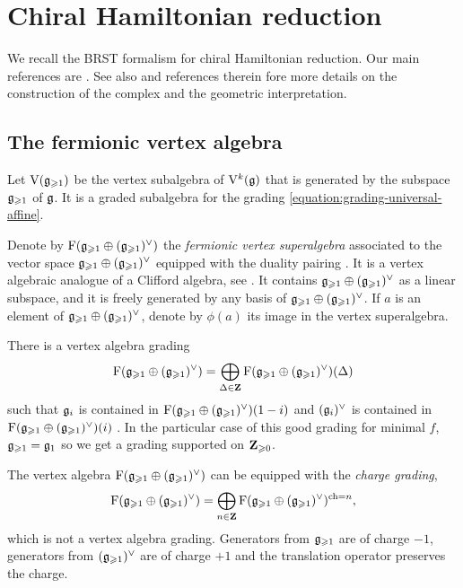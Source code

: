 
\section{Chiral Hamiltonian reduction} \label{section:brst}

We recall the BRST formalism for chiral Hamiltonian reduction. Our main references are \cite{feigin1990quantization,kac2003quantum,arakawa2007representation,arakawa2015localization}. See also \cite[Section 3.5]{genra2025reduction} and references therein fore more details on the construction of the complex and the geometric interpretation. 


\subsection{The fermionic vertex algebra}

Let $\mathrm V(\mathfrak g_{\geqslant 1})$ be the vertex subalgebra of $\mathrm V^k(\mathfrak g)$ that is generated by the subspace $\mathfrak g_{\geqslant 1}$ of $\mathfrak g$. It is a graded subalgebra for the grading \eqref{equation:grading-universal-affine}.


Denote by $\mathrm F(\mathfrak g_{\geqslant 1} \oplus (\mathfrak g_{\geqslant 1})^\vee)$ the \emph{fermionic vertex superalgebra} associated to the vector space $\mathfrak g_{\geqslant 1} \oplus (\mathfrak g_{\geqslant 1})^\vee$ equipped with the duality pairing \cite[Section 1.8]{desole2006finite}. It is a vertex algebraic analogue of a Clifford algebra, see \cite[Section 2.4.2]{genra2025reduction}. It contains $\mathfrak g_{\geqslant 1} \oplus (\mathfrak g_{\geqslant 1})^\vee$ as a linear subspace, and it is freely generated by any basis of $\mathfrak g_{\geqslant 1} \oplus (\mathfrak g_{\geqslant 1})^\vee$. If $a$ is an element of $\mathfrak g_{\geqslant 1} \oplus (\mathfrak g_{\geqslant 1})^\vee$, denote by $\phi(a)$ its image in the vertex superalgebra.

There is a vertex algebra grading
\[ \mathrm F(\mathfrak g_{\geqslant 1} \oplus (\mathfrak g_{\geqslant 1})^\vee) = \bigoplus_{\Delta \in \mathbf{Z}} \mathrm F(\mathfrak g_{\geqslant 1} \oplus (\mathfrak g_{\geqslant 1})^\vee)(\Delta) \] 
such that $\mathfrak g_i$ is contained in $\mathrm F(\mathfrak g_{\geqslant 1} \oplus (\mathfrak g_{\geqslant 1})^\vee)(1 - i)$ and $(\mathfrak g_i)^\vee$ is contained in $\mathrm F(\mathfrak g_{\geqslant 1} \oplus (\mathfrak g_{\geqslant 1})^\vee)(i)$ \cite[Equation (5.3)]{desole2006finite}. In the particular case of this good grading for minimal $f$, $\mathfrak g_{\geqslant 1} = \mathfrak g_1$ so we get a grading supported on $\mathbf{Z}_{\geqslant 0}$.

The vertex algebra $\mathrm F(\mathfrak g_{\geqslant 1} \oplus (\mathfrak g_{\geqslant 1})^\vee)$ can be equipped with the \emph{charge grading},
\[ \mathrm F(\mathfrak g_{\geqslant 1} \oplus (\mathfrak g_{\geqslant 1})^\vee) = \bigoplus_{n \in \mathbf{Z}} \mathrm F(\mathfrak g_{\geqslant 1} \oplus (\mathfrak g_{\geqslant 1})^\vee)^{\mathrm{ch} = n}, \] 
which is not a vertex algebra grading. Generators from $\mathfrak g_{\geqslant 1}$ are of charge $-1$, generators from $(\mathfrak g_{\geqslant 1})^\vee$ are of charge $+1$ and the translation operator preserves the charge.

